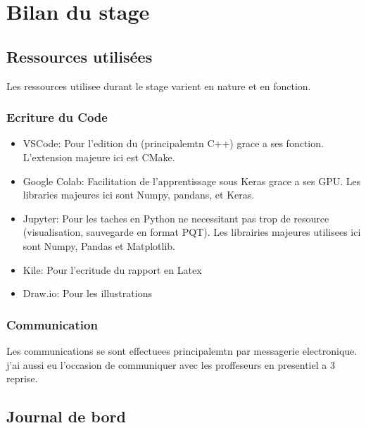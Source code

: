 
\chapter{Bilan du stage} %

\label{Chapter5} %


\section{Ressources utilisées}

Les ressources utilisee durant le stage varient en nature et en fonction.

\subsection{Ecriture du Code}
\begin{itemize}
 \item VSCode: Pour l'edition du (principalemtn C++) grace a ses fonction. L'extension majeure ici est CMake.
 \item Google Colab: Facilitation de l'apprentissage sous Keras grace a ses GPU. Les libraries majeures ici sont Numpy, pandans, et Keras.
 \item Jupyter: Pour les taches en Python ne necessitant pas trop de resource (visualisation, sauvegarde en format PQT). Les librairies majeures utilisees ici sont Numpy, Pandas et Matplotlib.
 \item Kile: Pour l'ecritude du rapport en Latex
 \item Draw.io: Pour les illustrations 
\end{itemize}


\subsection{Communication}
Les communications se sont effectuees principalemtn par messagerie electronique. j'ai aussi eu l'occasion de communiquer avec les proffeseurs en presentiel a 3 reprise.


\section{Journal de bord}
\label{sec:Journal}

